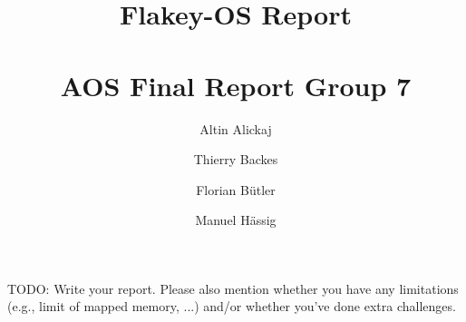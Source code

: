 \documentclass[11pt,
a4paper,
oneside,
abstract=true,
bibliography=notoc,
numbers=noenddot,
toc=nolistof
]{scrreprt}
\title{Flakey-OS Report\\\\\large AOS Final Report Group 7}
\author{Altin Alickaj \and Thierry Backes \and Florian Bütler \and Manuel Hässig}
\begin{document}
\maketitle

\tableofcontents

TODO: Write your report. Please also mention whether you have any limitations
(e.g., limit of mapped memory, ...) and/or whether you've done extra challenges.














\end{document}
